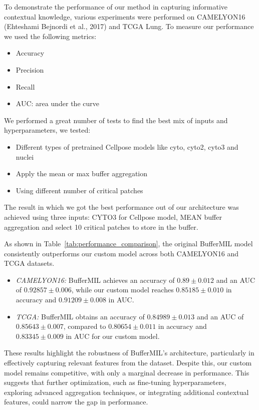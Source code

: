 \documentclass[10pt,twocolumn]{article}
\begin{document}
To demonstrate the performance of our method in capturing informative contextual knowledge, various experiments were performed on CAMELYON16 (Ehteshami Bejnordi et al., 2017)\cite{15b880f0e9424a5eb5cf74f6fc22f28a} and TCGA Lung. To measure our performance we used the following metrics:

\begin{itemize}
\item{Accuracy}
\item{Precision}
\item{Recall}
\item{AUC: area under the curve}
\end{itemize}

We performed a great number of tests to find the best mix of inputs and hyperparameters, we tested:

\begin{itemize}
\item{Different types of pretrained Cellpose models like cyto, cyto2, cyto3 and nuclei}
\item{Apply the mean or max buffer aggregation}
\item{Using different number of critical patches}
\end{itemize}

The result in which we got the best performance out of our architecture was achieved using three inputs: CYTO3 for Cellpose model, MEAN buffer aggregation and select 10 critical patches to store in the buffer. 


As shown in Table~\ref{tab:performance_comparison}, the original BufferMIL model consistently outperforms our custom model across both CAMELYON16 and TCGA datasets. 

\begin{itemize}
\item\textit{CAMELYON16:} BufferMIL achieves an accuracy of $0.89 \pm 0.012$ and an AUC of $0.92857 \pm 0.006$, while our custom model reaches $0.85185 \pm 0.010$ in accuracy and $0.91209 \pm 0.008$ in AUC.  
\item\textit{TCGA:} BufferMIL obtains an accuracy of $0.84989 \pm 0.013$ and an AUC of $0.85643 \pm 0.007$, compared to $0.80654 \pm 0.011$ in accuracy and $0.83345 \pm 0.009$ in AUC for our custom model.
\end{itemize}

These results highlight the robustness of BufferMIL’s architecture, particularly in effectively capturing relevant features from the dataset. Despite this, our custom model remains competitive, with only a marginal decrease in performance. This suggests that further optimization, such as fine-tuning hyperparameters, exploring advanced aggregation techniques, or integrating additional contextual features, could narrow the gap in performance.
\end{document}

